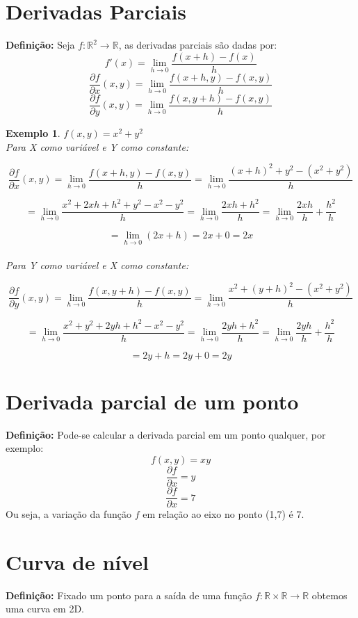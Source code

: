 \documentclass{book}
\numberwithin{defn}{chapter}
\newtheorem{exe}{Exemplo}
\numberwithin{exe}{chapter}
\numberwithin{ex}{chapter}
\numberwithin{obs}{chapter}
\numberwithin{fato}{chapter}
\numberwithin{resp}{chapter}
\begin{document}
\section{Derivadas Parciais} %

\textbf{Definição:} Seja \(f: \mathbb{R}^2 \rightarrow \mathbb{R}\), as derivadas parciais são dadas por: 
\[f'(x) = \lim_{h \to 0} \frac{f(x+h) - f(x)}{h}\]
\[\frac{\partial f}{\partial x}(x, y) = \lim_{h \to 0} \frac{f(x+h, y) - f(x,y)}{h}\]
\[\frac{\partial f}{\partial y}(x, y) = \lim_{h \to 0} \frac{f(x, y+h) - f(x,y)}{h}\]

\begin{exe} \(f(x, y) =x^2 + y^2\)\\

Para X como variável e Y como constante:

\[\frac{\partial f}{\partial x}(x, y) = \lim_{h \to 0} \frac{f(x+h, y) - f(x, y)}{h} = \lim_{h \to 0} \frac{(x + h)^2 + y^2 - (x^2 + y^2)}{h}\]

\[= \lim_{h \to 0} \frac{x^2 + 2xh + h^2 + y^2 - x^2 - y^2}{h} = \lim_{h \to 0} \frac{2xh + h^2}{h} = \lim_{h \to 0} \frac{2xh}{h} + \frac{h^2}{h}\]

\[= \lim_{h \to 0} (2x + h) = 2x + 0 = 2x\]\\

Para Y como variável e X como constante:

\[\frac{\partial f}{\partial y}(x, y) = \lim_{h \to 0} \frac{f(x, y+h) - f(x, y)}{h} = \lim_{h \to 0} \frac{x^2 + (y + h)^2 - (x^2 + y^2)}{h}\]

\[= \lim_{h \to 0} \frac{x^2 + y^2 + 2yh + h^2 - x^2 - y^2}{h} = \lim_{h \to 0} \frac{2yh + h^2}{h} = \lim_{h \to 0} \frac{2yh}{h} + \frac{h^2}{h}
\]

\[= 2y + h = 2y + 0 = 2y\]

\end{exe}

\section{Derivada parcial de um ponto} 
\textbf{Definição:} Pode-se calcular a derivada parcial em um ponto qualquer, por exemplo:
\[f(x, y) = xy\]
\[\frac{\partial f}{\partial x} = y\]
\[\frac{\partial f}{\partial x} = 7\]
Ou seja, a variação da função \(f\) em relação ao eixo no ponto (1,7) é 7.

\section{Curva de nível}
\textbf{Definição:} Fixado um ponto para a saída de uma função \(f: \mathbb{R} \times \mathbb{R} \rightarrow \mathbb{R}\) obtemos uma curva em 2D.
\end{document}
